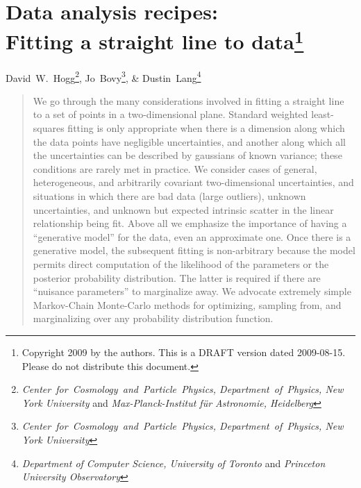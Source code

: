 \documentclass[12pt,twoside]{article}
\begin{document}
\thispagestyle{plain}\raggedbottom
\section*{Data analysis recipes:\ \\
  Fitting a straight line to data\footnote{
    Copyright 2009 by the authors.
    This is a DRAFT version dated 2009-08-15.
    Please do not distribute this document.}}

\noindent
David~W.~Hogg\footnote{\textsl{Center~for~Cosmology~and~Particle~Physics, Department~of~Physics, New York University} and \textsl{Max-Planck-Institut f\"ur Astronomie, Heidelberg}},
Jo~Bovy\footnote{\textsl{Center~for~Cosmology~and~Particle~Physics, Department~of~Physics, New York University}}, \&
Dustin~Lang\footnote{\textsl{Department of Computer Science, University of Toronto} and \textsl{Princeton University Observatory}}

\begin{abstract}
  We go through the many considerations involved in fitting a straight
  line to a set of points in a two-dimensional plane.  Standard
  weighted least-squares fitting is only appropriate when there is a
  dimension along which the data points have negligible uncertainties,
  and another along which all the uncertainties can be described by
  gaussians of known variance; these conditions are rarely met in
  practice.  We consider cases of general, heterogeneous, and
  arbitrarily covariant two-dimensional uncertainties, and situations
  in which there are bad data (large outliers), unknown uncertainties,
  and unknown but expected intrinsic scatter in the linear
  relationship being fit.  Above all we emphasize the importance of
  having a ``generative model'' for the data, even an approximate one.
  Once there is a generative model, the subsequent fitting is
  non-arbitrary because the model permits direct computation of the
  likelihood of the parameters or the posterior probability
  distribution.  The latter is required if there are ``nuisance
  parameters'' to marginalize away.  We advocate extremely simple
  Markov-Chain Monte-Carlo methods for optimizing, sampling from, and
  marginalizing over any probability distribution function.
\end{abstract}
\end{document}
